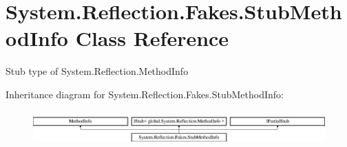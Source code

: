 \hypertarget{class_system_1_1_reflection_1_1_fakes_1_1_stub_method_info}{\section{System.\-Reflection.\-Fakes.\-Stub\-Method\-Info Class Reference}
\label{class_system_1_1_reflection_1_1_fakes_1_1_stub_method_info}
}


Stub type of System.\-Reflection.\-Method\-Info 


Inheritance diagram for System.\-Reflection.\-Fakes.\-Stub\-Method\-Info\-:\begin{figure}[H]
\begin{center}
\leavevmode
\includegraphics[height=1.347774cm]{class_system_1_1_reflection_1_1_fakes_1_1_stub_method_info}
\end{center}
\end{figure}
